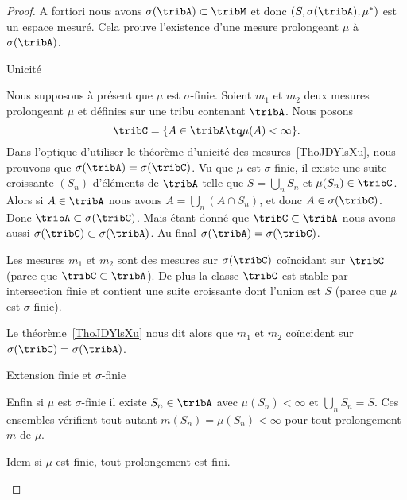 \begin{proof}
    A fortiori nous avons \( \sigma(\tribA)\subset\tribM\) et donc \( (S,\sigma(\tribA),\mu^*)\) est un espace mesuré. Cela prouve l'existence d'une mesure prolongeant \( \mu\) à \( \sigma(\tribA)\).

    \begin{subproof}
        \item[Unicité]

            Nous supposons à présent que \( \mu\) est \( \sigma\)-finie. Soient \( m_1\) et \( m_2\) deux mesures prolongeant \( \mu\) et définies sur une tribu contenant \( \tribA\). Nous posons
            \begin{equation}
                \tribC=\{ A\in\tribA\tq\mu(A)<\infty \}.
            \end{equation}
            Dans l'optique d'utiliser le théorème d'unicité des mesures~\ref{ThoJDYlsXu}, nous prouvons que \( \sigma(\tribA)=\sigma(\tribC)\). Vu que \( \mu\) est \( \sigma\)-finie, il existe une suite croissante \( (S_n)\) d'éléments de \( \tribA\) telle que \( S=\bigcup_nS_n\) et \( \mu(S_n)\in\tribC\). Alors si \( A\in\tribA\) nous avons \( A=\bigcup_n(A\cap S_n)\), et donc \( A\in\sigma(\tribC)\). Donc \( \tribA\subset\sigma(\tribC)\). Mais étant donné que \( \tribC\subset\tribA\) nous avons aussi \( \sigma(\tribC)\subset\sigma(\tribA)\). Au final \( \sigma(\tribA)=\sigma(\tribC)\).

            Les mesures \( m_1\) et \( m_2\) sont des mesures sur \( \sigma(\tribC)\) coïncidant sur \( \tribC\) (parce que \( \tribC\subset\tribA\)). De plus la classe \( \tribC\) est stable par intersection finie et contient une suite croissante dont l'union est \( S\) (parce que \( \mu\) est \( \sigma\)-finie).

            Le théorème~\ref{ThoJDYlsXu} nous dit alors que \( m_1\) et \( m_2\) coïncident sur \( \sigma(\tribC)=\sigma(\tribA)\).

        \item[Extension finie et \( \sigma\)-finie]

            Enfin si \( \mu\) est \( \sigma\)-finie il existe \( S_n\in\tribA\) avec \( \mu(S_n)<\infty\) et \( \bigcup_nS_n=S\). Ces ensembles vérifient tout autant \( m(S_n)=\mu(S_n)<\infty\) pour tout prolongement \( m\) de \( \mu\).

            Idem si \( \mu\) est finie, tout prolongement est fini.
    \end{subproof}
\end{proof}

